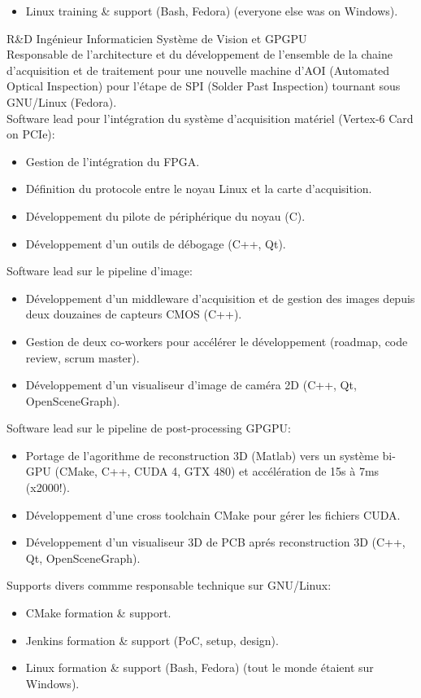 \documentclass{article}
\begin{document}
\begin{llist}
{\begin{itemize}
	\item Linux training \& support (Bash, Fedora) (everyone else was on Windows).
\end{itemize}
} {
R\&D Ing\'{e}nieur Informaticien Syst\`{e}me de Vision et GPGPU\\
Responsable de l'architecture et du d\'{e}veloppement de l'ensemble de la chaine d'acquisition et de traitement
pour une nouvelle machine d'AOI (Automated Optical Inspection) pour l'\'{e}tape de SPI (Solder Past Inspection)
tournant sous GNU/Linux (Fedora).\\
Software lead pour l'int\'{e}gration du syst\`{e}me d'acquisition mat\'{e}riel (Vertex-6 Card on PCIe):
\vspace{-0.50cm}
\begin{itemize}
	\item Gestion de l'int\'{e}gration du FPGA.
	\item D\'{e}finition du protocole entre le noyau Linux et la carte d'acquisition.
	\item D\'{e}veloppement du pilote de p\'{e}riph\'{e}rique du noyau (C).
	\item D\'{e}veloppement d'un outils de d\'{e}bogage (C++, Qt).
\end{itemize}
Software lead sur le pipeline d'image:
\vspace{-0.50cm}
\begin{itemize}
	\item D\'{e}veloppement d'un middleware d'acquisition et de gestion des
		images depuis deux douzaines de capteurs CMOS (C++).
	\item Gestion de deux co-workers pour acc\'{e}l\'{e}rer le d\'{e}veloppement (roadmap, code review, scrum master).
	\item D\'{e}veloppement d'un visualiseur d'image de cam\'{e}ra 2D (C++, Qt, OpenSceneGraph).
\end{itemize}
Software lead sur le pipeline de post-processing GPGPU:
\vspace{-0.50cm}
\begin{itemize}
	\item Portage de l'agorithme de reconstruction 3D (Matlab) vers un syst\`{e}me bi-GPU (CMake, C++, CUDA 4, GTX 480)
		et acc\'{e}l\'{e}ration de 15s \`{a} 7ms (x2000!).
	\item D\'{e}veloppement d'une cross toolchain CMake pour g\'{e}rer les fichiers CUDA.
	\item D\'{e}veloppement d'un visualiseur 3D de PCB apr\'{e}s reconstruction 3D (C++, Qt, OpenSceneGraph).
\end{itemize}
Supports divers commme responsable technique sur GNU/Linux:
\vspace{-0.50cm}
\begin{itemize}
	\item CMake formation \& support.
	\item Jenkins formation \& support (PoC, setup, design).
	\item Linux formation \& support (Bash, Fedora) (tout le monde \'{e}taient sur Windows).
\end{itemize}
}


\end{llist}
\end{document}
